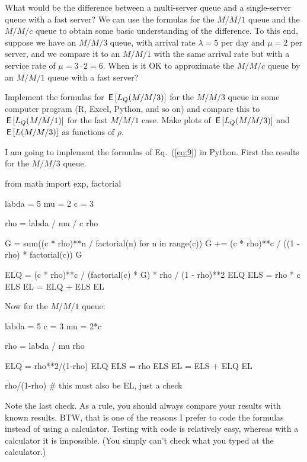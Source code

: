 \begin{exercise}\label{ex:27}
  What would be the difference between a multi-server queue and a
  single-server queue with a fast server? We can use the formulas for
  the $M/M/1$ queue and the $M/M/c$ queue to obtain some basic
  understanding of the difference. To this end, suppose we have an
  $M/M/3$ queue, with arrival rate $\lambda = 5$ per day and $\mu=2$
  per server, and we compare it to an $M/M/1$ with the same arrival
  rate but with a service rate of $\mu = 3\cdot 2 = 6$. 
 When is it OK to approximate the $M/M/c$ queue by an $M/M/1$
    queue with a fast server?
    \begin{hint}
Implement the formulas for $\,\mathsf{E}\left[L_Q(M/M/3)\right]$ for the $M/M/3$ queue in
  some computer program (R, Excel, Python, and so on) and compare this
  to $\,\mathsf{E}\left[L_Q(M/M/1)\right]$ for the fast $M/M/1$ case.  Make plots of
  $\,\mathsf{E}\left[L_Q(M/M/3)\right]$ and $\,\mathsf{E}\left[L(M/M/3)\right]$ as functions of $\rho$.
    \end{hint}

  \begin{solution}
I am going to implement the formulas of Eq.~(\ref{eq:9}) in Python. First the results for the $M/M/3$ queue.

\begin{pyconsole}
from math import exp, factorial

labda = 5
mu = 2
c = 3

rho = labda / mu / c
rho

G = sum((c * rho)**n / factorial(n) for n in range(c))
G += (c * rho)**c / ((1 - rho) * factorial(c))
G

ELQ = (c * rho)**c / (factorial(c) * G) * rho / (1 - rho)**2
ELQ
ELS = rho * c
ELS
EL = ELQ + ELS
EL
\end{pyconsole}

Now for the $M/M/1$ queue:

\begin{pyconsole}
labda = 5
c = 3
mu = 2*c

rho = labda / mu 
rho

ELQ = rho**2/(1-rho)
ELQ
ELS = rho
ELS
EL = ELS + ELQ
EL

rho/(1-rho) # this must also be EL, just a check
\end{pyconsole}

Note the last check. As a rule, you should always compare your results
with known results. BTW, that is one of the reasons I prefer to code
the formulas instead of using a calculator. Testing with code is
relatively easy, whereas with a calculator it is impossible. (You
simply can't check what you typed at the calculator.)


\end{solution}
\end{exercise}
